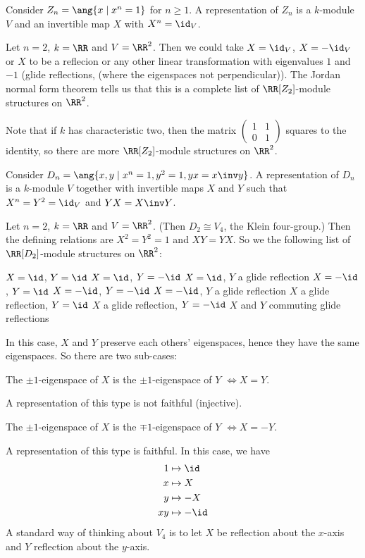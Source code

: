 \begin{exam}
	\leavevmode
	\begin{enum}
		\io
		Consider $Z_n = \ang{x \mid x^n=1}$ for $n \geq 1$.
		A representation of $Z_n$ is a $k$-module $V$ and an invertible map $X$ with $X^n=\id_V$.
		
		Let $n=2$, $k=\RR$ and $V=\RR^2$.
		Then we could take $X=\id_V$, $X=-\id_V$ or $X$ to be a reflecion or any other linear transformation with eigenvalues $1$ and $-1$ (glide reflections, (where the eigenspaces not perpendicular)).
		The Jordan normal form theorem tells us that this is a complete list of $\RR[Z_2]$-module structures on $\RR^2$.
		
		Note that if $k$ has characteristic two, then the matrix
		$\left(\begin{smallmatrix}
		1 & 1 \\ 0 & 1
		\end{smallmatrix}\right)$
		squares to the identity, so there are more $\RR[Z_2]$-module structures on $\RR^2$.
		
		\io
		Consider $D_n = \ang{x,y \mid x^n=1,y^2=1,yx=x\inv y}$.
		A representation of $D_n$ is a $k$-module $V$ together with invertible maps $X$ and $Y$ such that $X^n=Y^2=\id_V$ and $YX=X\inv Y$.
		
		Let $n=2$, $k=\RR$ and $V=\RR^2$.
		(Then $D_2 \cong V_4$, the Klein four-group.)
		Then the defining relations are $X^2=Y^2=1$ and $XY=YX$.
		So we the following list of $\RR[D_2]$-module structures on $\RR^2$:
		\begin{enum}
			\io $X=\id$, $Y=\id$
			\io $X=\id$, $Y=-\id$
			\io $X=\id$, $Y$ a glide reflection
			\io $X=-\id$, $Y=\id$
			\io $X=-\id$, $Y=-\id$
			\io\label{item:casef} $X=-\id$, $Y$ a glide reflection
			\io $X$ a glide reflection, $Y=\id$
			\io $X$ a glide reflection, $Y=-\id$
			\io $X$ and $Y$ commuting glide reflections
			\par
			In this case, $X$ and $Y$ preserve each others' eigenspaces, hence they have the same eigenspaces.
			So there are two sub-cases:
			\begin{enum}
				\io\label{item:case2i'}
				The $\pm1$-eigenspace of $X$ is the $\pm1$-eigenspace of $Y$ $\iff X=Y$.
				\par
				A representation of this type is not faithful (injective).
				
				\io\label{item:case2i''}
				The $\pm1$-eigenspace of $X$ is the $\mp1$-eigenspace of $Y$ $\iff X=-Y$.
				\par
				A representation of this type is faithful.
				In this case, we have
				\begin{align*}
					1 &\mapsto \id \\
					x &\mapsto X \\
					y &\mapsto -X \\
					xy &\mapsto -\id
				\end{align*}
				A standard way of thinking about $V_4$ is to let $X$ be reflection about the $x$-axis and $Y$ reflection about the $y$-axis.
				

\end{enum}
\end{enum}
\end{enum}
\end{exam}
